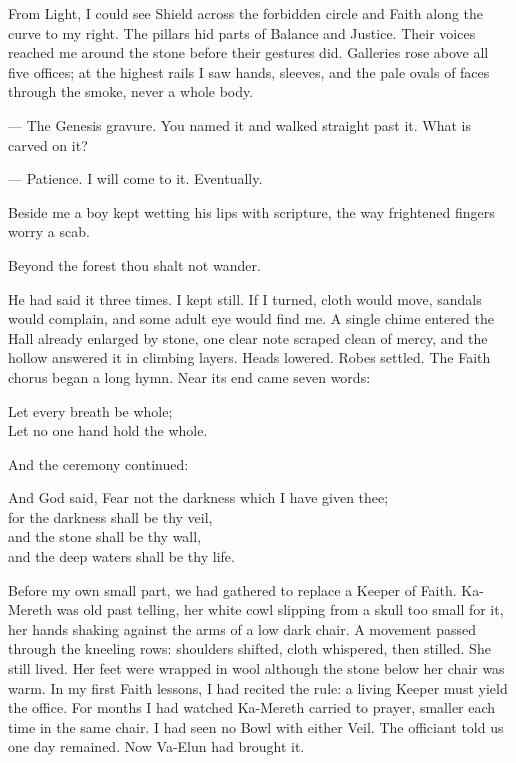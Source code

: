 From Light, I could see Shield across the forbidden circle and Faith along the curve to my right. The pillars hid parts of Balance and Justice. Their voices reached me around the stone before their gestures did. Galleries rose above all five offices; at the highest rails I saw hands, sleeves, and the pale ovals of faces through the smoke, never a whole body. \par

\begin{room}

--- The Genesis gravure. You named it and walked straight past it. What is carved on it?

--- Patience. I will come to it. Eventually.

\end{room}

Beside me a boy kept wetting his lips with scripture, the way frightened fingers worry a scab.\par

\begin{scripture}
Beyond the forest thou shalt not wander.
\end{scripture}

He had said it three times. I kept still. If I turned, cloth would move, sandals would complain, and some adult eye would find me. A single chime entered the Hall already enlarged by stone, one clear note scraped clean of mercy, and the hollow answered it in climbing layers. Heads lowered. Robes settled. The Faith chorus began a long hymn. Near its end came seven words:\par

\begin{scripture}
Let every breath be whole;\\
Let no one hand hold the whole.
\end{scripture}

And the ceremony continued:

\begin{scripture}
And God said, Fear not the darkness which I have given thee; \\
for the darkness shall be thy veil, \\
and the stone shall be thy wall, \\
and the deep waters shall be thy life.
\end{scripture}

\ornament

Before my own small part, we had gathered to replace a Keeper of Faith. Ka-Mereth was old past telling, her white cowl slipping from a skull too small for it, her hands shaking against the arms of a low dark chair. A movement passed through the kneeling rows: shoulders shifted, cloth whispered, then stilled. She still lived. Her feet were wrapped in wool although the stone below her chair was warm. In my first Faith lessons, I had recited the rule: a living Keeper must yield the office. For months I had watched Ka-Mereth carried to prayer, smaller each time in the same chair. I had seen no Bowl with either Veil. The officiant told us one day remained. Now Va-Elun had brought it.\par

